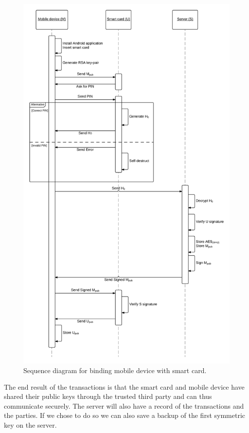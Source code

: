\newpage
\begin{figure}[h!]
  \caption{Sequence diagram for binding mobile device with smart card.}
  \label{fig:sqd}
  \centering
    \includegraphics[height=0.93\textheight]{images/SQD_handshake.png}
\end{figure}
\newpage
The end result of the transactions is that the smart card and mobile device have shared their public keys through the trusted third party and can thus communicate securely. The server will also have a record of the transactions and the parties. If we chose to do so we can also save a backup of the first symmetric key on the server.

